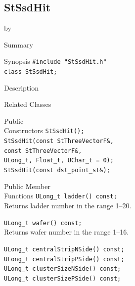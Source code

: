 \documentclass[twoside]{article}
\newcommand{\entrylabel}[1]{\mbox{\textbf{{#1}}}\hfil}%
\newenvironment{entry}
{\begin{list}{}%
    {\renewcommand{\makelabel}{\entrylabel}%
     \setlength{\labelwidth}{90pt}%
     \setlength{\leftmargin}{\labelwidth}
     \advance\leftmargin by \labelsep%
      }%
    }%
  {\end{list}}
\newcommand{\Entrylabel}[1]%
{\raisebox{0pt}[1ex][0pt]{\makebox[\labelwidth][l]%
    {\parbox[t]{\labelwidth}{\hspace{0pt}\textbf{{#1}}}}}}
\newenvironment{Entry}%
{\renewcommand{\entrylabel}{\Entrylabel}\begin{entry}}%
  {\end{entry}}
\begin{document}
\subsection{StSsdHit}
\label{sec:StSsdHit}
\begin{Entry}
\item[Summary]
\item[Synopsis]
    \verb+#include "StSsdHit.h"+\\
    \verb+class StSsdHit;+\\
\item[Description]
\item[Related Classes]
\item[Public\\ Constructors]
    \verb+StSsdHit();+\\
    \verb+StSsdHit(const StThreeVectorF&,+\\
    \verb+const StThreeVectorF&,+\\
    \verb+ULong_t, Float_t, UChar_t = 0);+\\
    \verb+StSsdHit(const dst_point_st&);+\\
\item[Public Member\\ Functions]
    \verb+ULong_t ladder() const;+\\
    Returns ladder number in the range 1--20.
    
    \verb+ULong_t wafer() const;+\\
    Returns wafer number in the range 1--16.
    
    \verb+ULong_t centralStripNSide() const;+\\
    \verb+ULong_t centralStripPSide() const;+\\
    \verb+ULong_t clusterSizeNSide() const;+\\
    \verb+ULong_t clusterSizePSide() const;+\\
\end{Entry}
\clearpage
\end{document}
